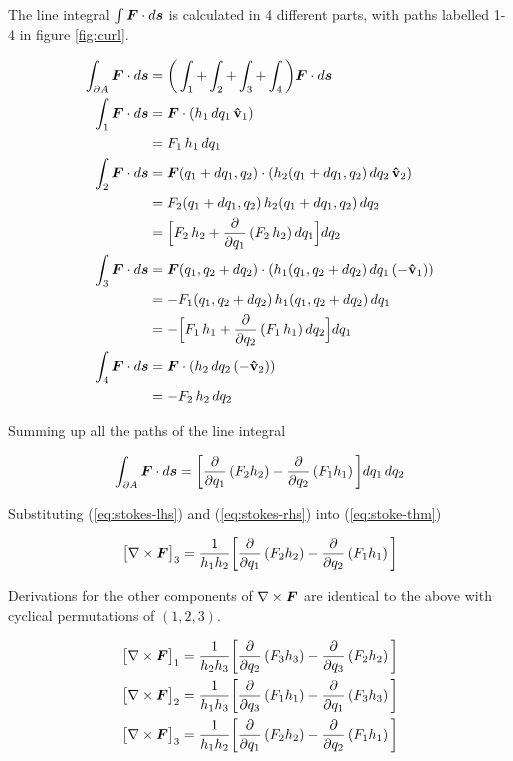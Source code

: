 \documentclass[twoside, a4paper]{article}
\begin{document}
The line integral $\int \mbox{\boldmath$ F $} \cdot d\mbox{\boldmath$ s $}$ is calculated in 4 different parts, with paths labelled 1-4 in figure \ref{fig:curl}. 

\begin{align*}
\int_{\partial A} \mbox{\boldmath$ F $} \cdot d\mbox{\boldmath$ s $} & = 
\bigg( 
\int_1 + \int_2 + \int_3 + \int_4 
\bigg)
\mbox{\boldmath$ F $} \cdot d\mbox{\boldmath$ s $} \\
\int_1 \mbox{\boldmath$ F $} \cdot d\mbox{\boldmath$ s $}
& = \mbox{\boldmath$ F $} \cdot \left( h_1 \, dq_1 \, \mathbf{\hat{v}}_1 \right) \\
& = F_1 \, h_1 \, dq_1 \\
\int_2 \mbox{\boldmath$ F $} \cdot d\mbox{\boldmath$ s $}
& = \mbox{\boldmath$ F $}(q_1+dq_1, q_2) \cdot \left( h_2(q_1+dq_1, q_2) \, dq_2 \, \mathbf{\hat{v}}_2 \right) \\
& = F_2(q_1+dq_1, q_2) \, h_2(q_1+dq_1, q_2) \, dq_2 \\
& = \Big[ F_2 \, h_2 + \frac{\partial }{\partial q_1} \left( F_2 \, h_2 \right) dq_1 \Big] dq_2 \\
\int_3 \mbox{\boldmath$ F $} \cdot d\mbox{\boldmath$ s $}
& = \mbox{\boldmath$ F $}(q_1, q_2+dq_2) \cdot \left( h_1(q_1, q_2+dq_2) \, dq_1 \, (-\mathbf{\hat{v}}_1) \right) \\
& = -F_1(q_1, q_2+dq_2) \, h_1(q_1, q_2+dq_2) \, dq_1 \\
& = -\Big[ F_1 \, h_1 + \frac{\partial }{\partial q_2} \left( F_1 \, h_1 \right) dq_2 \Big] dq_1 \\
\int_4 \mbox{\boldmath$ F $} \cdot d\mbox{\boldmath$ s $}
& = \mbox{\boldmath$ F $} \cdot \left( h_2 \, dq_2 \, (-\mathbf{\hat{v}}_2) \right) \\
& = -F_2 \, h_2 \, dq_2
\end{align*}

Summing up all the paths of the line integral

\begin{equation}
\label{eq:stokes-rhs}
\int_{\partial A} \mbox{\boldmath$ F $} \cdot d\mbox{\boldmath$ s $}
=
\bigg[
\frac{\partial }{\partial q_1} \left( F_2 h_2 \right) - \frac{\partial }{\partial q_2} \left( F_1 h_1 \right)
\bigg]
dq_1 \, dq_2
\end{equation}

Substituting (\ref{eq:stokes-lhs}) and (\ref{eq:stokes-rhs}) into (\ref{eq:stoke-thm})

\begin{equation*}
\big[ \nabla \times \mbox{\boldmath$ F $} \big]_3 = 
\frac{1}{h_1 h_2}
\bigg[
\frac{\partial }{\partial q_1} \left( F_2 h_2 \right) - \frac{\partial }{\partial q_2} \left( F_1 h_1 \right)
\bigg]
\end{equation*}

Derivations for the other components of $\nabla \times \mbox{\boldmath$ F $}$ are identical to the above with cyclical permutations of $(1,2,3)$.

\begin{equation}
\label{eq:curl-components}
\begin{split}
\big[ \nabla \times \mbox{\boldmath$ F $} \big]_1 = 
\frac{1}{h_2 h_3}
\bigg[
\frac{\partial }{\partial q_2} \left( F_3 h_3 \right) - \frac{\partial }{\partial q_3} \left( F_2 h_2 \right)
\bigg] \\
\big[ \nabla \times \mbox{\boldmath$ F $} \big]_2 = 
\frac{1}{h_1 h_3}
\bigg[
\frac{\partial }{\partial q_3} \left( F_1 h_1 \right) - \frac{\partial }{\partial q_1} \left( F_3 h_3 \right)
\bigg] \\
\big[ \nabla \times \mbox{\boldmath$ F $} \big]_3 = 
\frac{1}{h_1 h_2}
\bigg[
\frac{\partial }{\partial q_1} \left( F_2 h_2 \right) - \frac{\partial }{\partial q_2} \left( F_1 h_1 \right)
\bigg]
\end{split}
\end{equation}
\end{document}
